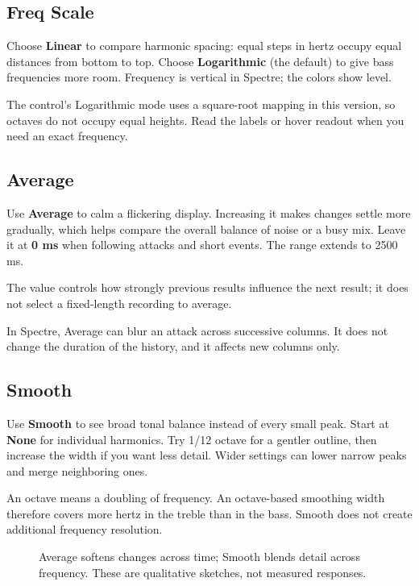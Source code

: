\clearpage
\subsection{Freq Scale}

Choose \textbf{Linear} to compare harmonic spacing: equal steps in hertz
occupy equal distances from bottom to top. Choose \textbf{Logarithmic}
(the default) to give bass frequencies more room. Frequency is vertical in
Spectre; the colors show level.

The control's Logarithmic mode uses a square-root mapping in this version,
so octaves do not occupy equal heights. Read the labels or hover readout
when you need an exact frequency.

\subsection{Average}
Use \textbf{Average} to calm a flickering display. Increasing it makes
changes settle more gradually, which helps compare the overall balance of
noise or a busy mix. Leave it at \textbf{0 ms} when following attacks and
short events. The range extends to 2500 ms.

The value controls how strongly previous results influence the next result;
it does not select a fixed-length recording to average.

In Spectre, Average can blur an attack across successive columns. It does
not change the duration of the history, and it affects new columns only.

\subsection{Smooth}
Use \textbf{Smooth} to see broad tonal balance instead of every small
peak. Start at \textbf{None} for individual harmonics. Try 1/12 octave for a
gentler outline, then increase the width if you want less detail. Wider
settings can lower narrow peaks and merge neighboring ones.

An octave means a doubling of frequency. An octave-based smoothing width
therefore covers more hertz in the treble than in the bass. Smooth does not
create additional frequency resolution.

\begin{figure}[!htp]
\centering

\caption{Average softens changes across time; Smooth blends detail across
frequency. These are qualitative sketches, not measured responses.}
\end{figure}

